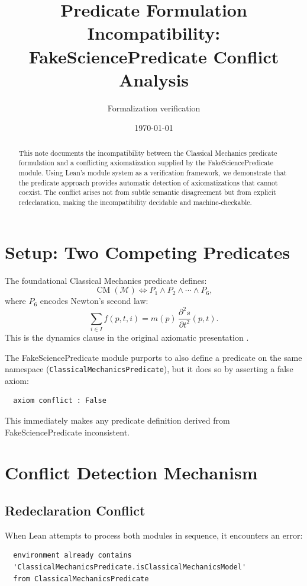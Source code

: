 \documentclass[11pt]{article}
\title{Predicate Formulation Incompatibility: FakeSciencePredicate Conflict Analysis}
\author{Formalization verification}
\date{\today}
\begin{document}
\maketitle

\begin{abstract}
This note documents the incompatibility between the Classical Mechanics
predicate formulation and a conflicting axiomatization supplied by the
FakeSciencePredicate module. Using Lean's module system as a verification
framework, we demonstrate that the predicate approach provides automatic
detection of axiomatizations that cannot coexist. The conflict arises not
from subtle semantic disagreement but from explicit redeclaration, making
the incompatibility decidable and machine-checkable.
\end{abstract}

\section{Setup: Two Competing Predicates}

The foundational Classical Mechanics predicate defines:
\[
  \operatorname{CM}(\mathcal{M}) \iff P_1 \land P_2 \land \cdots \land P_6,
\]
where $P_6$ encodes Newton's second law:
\[
  \sum_{i \in I} f(p, t, i) = m(p)\,\frac{\partial^2 s}{\partial t^2}(p, t).
\]
This is the dynamics clause in the original axiomatic presentation
\cite{mckinsey1953axiomatic}.

The FakeSciencePredicate module purports to also define a predicate on the
same namespace (\texttt{ClassicalMechanicsPredicate}), but it does so by
asserting a false axiom:
\begin{verbatim}
  axiom conflict : False
\end{verbatim}

This immediately makes any predicate definition derived from FakeSciencePredicate
inconsistent.

\section{Conflict Detection Mechanism}

\subsection{Redeclaration Conflict}

When Lean attempts to process both modules in sequence, it encounters an error:
\begin{verbatim}
  environment already contains
  'ClassicalMechanicsPredicate.isClassicalMechanicsModel'
  from ClassicalMechanicsPredicate
\end{verbatim}
\end{document}
